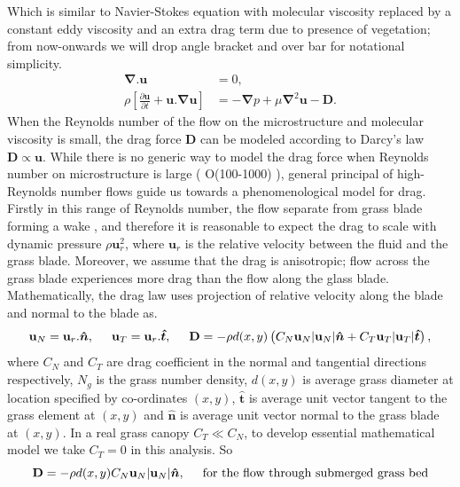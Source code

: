 \documentclass[12pt]{report}   %
\newcommand{\bn}{{\boldsymbol{\hat{n}}}}
\newcommand{\bt}{{\boldsymbol{\hat{t}}}}
\newcommand{\bu}{\mathbf{u}}
\newcommand{\grad}{\mathbf{\nabla}}
\begin{document}
Which is similar to Navier-Stokes equation with molecular viscosity replaced by a constant eddy viscosity and an extra drag term due to presence of vegetation; from now-onwards we will drop angle bracket and over bar for notational simplicity.
\begin{equation}\label{averaged_eq}
\begin{split}
  \grad .{\bu}&=0, \\
 \rho \left[ \frac{\partial {\bu}  }{\partial t}+  {\bu} . \grad \bu  \right ] &= - \grad{p}  +\mu \grad^2\bu - \mathbf{D} .
\end{split}
\end{equation}
When the Reynolds number of the flow on the microstructure and molecular viscosity is small, the drag force $\mathbf{D}$ can be modeled according to Darcy's law $\mathbf{D} \propto \bu$. While there is no generic way to model the drag force when Reynolds number on microstructure is large ( O(100-1000) ), general principal of high-Reynolds number flows guide us towards a phenomenological model for drag. Firstly in this range of Reynolds number, the flow separate from grass blade forming a wake , and therefore it is reasonable to expect the drag to scale with dynamic pressure $\rho \bu_r^2$, where $\bu_r$ is the relative velocity between the fluid and the grass blade. Moreover, we assume that the drag is anisotropic; flow across the grass blade experiences more drag than the flow along the glass blade. Mathematically, the drag law uses projection of relative velocity along the blade and normal to the blade as.
\begin{equation}
 \bu_N = \bu_r.\bn,\hspace{0.5cm} \bu_T = \bu_r.\bt,\hspace{.5cm} \mathbf{D} = -\rho d(x,y)\left( C_N \bu_N |\bu_N|\bn + C_T \bu_T |\bu_T| \bt \right),
\end{equation} 
where $C_N$ and $C_T$ are drag coefficient in the normal and tangential directions respectively, $N_g$ is the grass number density, $d(x,y)$ is average grass diameter at location specified by co-ordinates $(x,y)$, $\bt$ is average unit vector tangent to the grass element at $(x,y)$ and $\bn$ is average unit vector normal to the grass blade at $(x,y)$. In a real grass canopy $C_T \ll C_N$, to develop essential mathematical model we take $C_T=0$ in this analysis. So
\begin{equation}
 \mathbf{D} = -\rho d(x,y) C_N \bu_N |\bu_N| \bn, \hspace{.5cm} \text{for the flow through submerged grass bed}
\end{equation}
\end{document}

